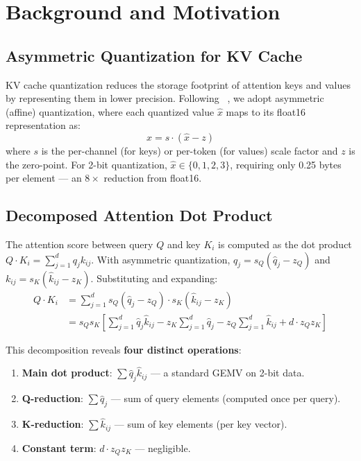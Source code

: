 \section{Background and Motivation}
\label{sec:prelim}

\subsection{Asymmetric Quantization for KV Cache}

KV cache quantization reduces the storage footprint of attention keys and values by representing them in lower precision.
Following \kivi{}~\citep{kivi}, we adopt asymmetric (affine) quantization, where each quantized value $\hat{x}$ maps to its float16 representation as:
\begin{equation}
x = s \cdot (\hat{x} - z)
\label{eq:dequant}
\end{equation}
where $s$ is the per-channel (for keys) or per-token (for values) scale factor and $z$ is the zero-point.
For 2-bit quantization, $\hat{x} \in \{0,1,2,3\}$, requiring only 0.25 bytes per element — an $8\times$ reduction from float16.

\subsection{Decomposed Attention Dot Product}

The attention score between query $Q$ and key $K_i$ is computed as the dot product $Q \cdot K_i = \sum_{j=1}^{d} q_j k_{ij}$.
With asymmetric quantization, $q_j = s_Q(\hat{q}_j - z_Q)$ and $k_{ij} = s_K(\hat{k}_{ij} - z_K)$.
Substituting and expanding:
\begin{equation}
\begin{aligned}
Q \cdot K_i &= \sum_{j=1}^{d} s_Q(\hat{q}_j - z_Q) \cdot s_K(\hat{k}_{ij} - z_K) \\
&= s_Q s_K \left[\sum_{j=1}^{d} \hat{q}_j \hat{k}_{ij} - z_K\sum_{j=1}^{d} \hat{q}_j - z_Q\sum_{j=1}^{d} \hat{k}_{ij} + d \cdot z_Q z_K\right]
\end{aligned}
\label{eq:full_expansion}
\end{equation}

This decomposition reveals \textbf{four distinct operations}:
\begin{enumerate}
\item \textbf{Main dot product}: $\sum \hat{q}_j \hat{k}_{ij}$ — a standard GEMV on 2-bit data.
\item \textbf{Q-reduction}: $\sum \hat{q}_j$ — sum of query elements (computed once per query).
\item \textbf{K-reduction}: $\sum \hat{k}_{ij}$ — sum of key elements (per key vector).
\item \textbf{Constant term}: $d \cdot z_Q z_K$ — negligible.
\end{enumerate}

